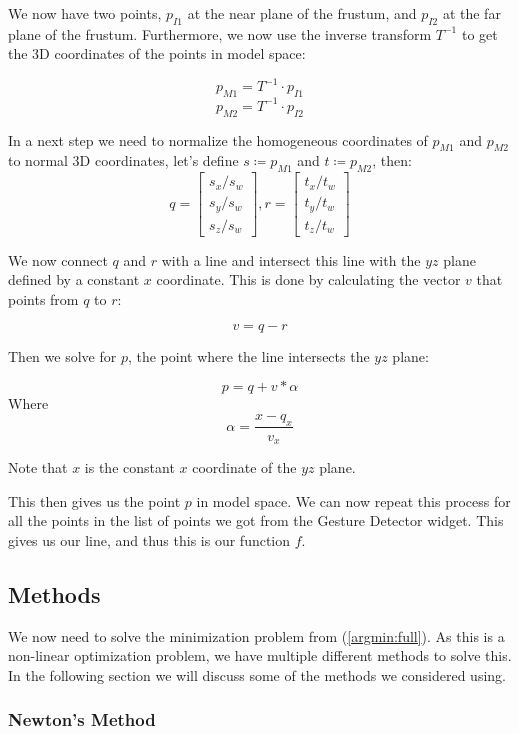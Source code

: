 We now have two points, $p_{I1}$ at the near plane of the frustum, and $p_{I2}$ at the far plane of the frustum. Furthermore, we now use the inverse transform $T^{-1}$ to get the 3D coordinates of the points in model space:

\[p_{M1} = T^{-1} \cdot p_{I1}\]
\[p_{M2} = T^{-1} \cdot p_{I2}\]

In a next step we need to normalize the homogeneous coordinates of $p_{M1}$ and $p_{M2}$ to normal 3D coordinates, let's define $s \coloneqq p_{M1}$ and $t \coloneqq p_{M2}$, then:
\[
    q = 
    \begin{bmatrix}
    s_x/s_w \\ s_y/s_w \\ s_z/s_w
    \end{bmatrix},
    r = 
    \begin{bmatrix}
    t_x/t_w \\ t_y/t_w \\ t_z/t_w
    \end{bmatrix}
    \]

We now connect $q$ and $r$ with a line and intersect this line with the $yz$ plane defined by a constant $x$ coordinate. This is done by calculating the vector $v$ that points from $q$ to $r$:

\[v = q - r\]

Then we solve for $p$, the point where the line intersects the $yz$ plane:

\[p = q + v * \alpha\] Where \[\alpha = \frac{x - q_x}{v_x}\]

Note that $x$ is the constant $x$ coordinate of the $yz$ plane.

This then gives us the point $p$ in model space. We can now repeat this process for all the points in the list of points we got from the Gesture Detector widget. This gives us our line, and thus this is our function $f$.

\subsection{Methods}\label{sec:methods}

We now need to solve the minimization problem from (\ref{argmin:full}). As this is a non-linear optimization problem, we have multiple different methods to solve this. In the following section we will discuss
some of the methods we considered using. 

\subsubsection{Newton's Method}

